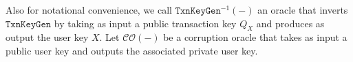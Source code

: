 \documentclass{mrl}
\theoremstyle{definition}
\begin{document}
% 


Also for notational convenience, we call $\texttt{TxnKeyGen}^{-1}(-)$ an oracle that inverts $\texttt{TxnKeyGen}$ by taking as input a public transaction key $Q_X$ and produces as output the user key $X$. Let $\mathcal{CO}(-)$ be a corruption oracle that takes as input a public user key and outputs the associated private user key.



\end{document}
